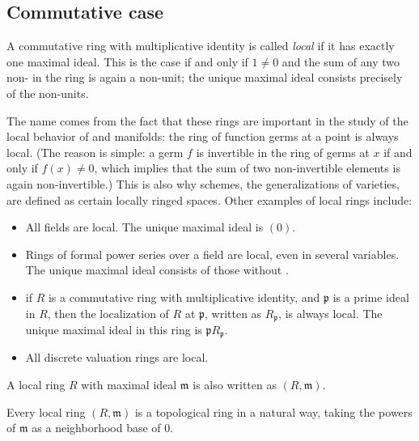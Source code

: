 \documentclass[12pt]{article}
\begin{document}

\subsection*{Commutative case}

A commutative ring with multiplicative identity is called {\em local} if it has exactly one maximal ideal.
This is the case if and only if $1\not=0$ and the sum of any two non- in the ring is again a non-unit; the unique maximal ideal consists precisely of the non-units.

The name comes from the fact that these rings are important in the study of the local behavior of  and manifolds: the ring of function germs at a point is always local. (The reason is simple: a germ $f$ is invertible in the ring of germs at $x$ if and only if $f(x)\not=0$, which implies that the sum of two non-invertible elements is again non-invertible.)
This is also why schemes, the generalizations of varieties, are defined as certain locally ringed spaces. Other examples of local rings include:
\begin{itemize}
\item All fields are local. The unique maximal ideal is $(0)$.
\item Rings of formal power series over a field are local, even in several variables. The unique maximal ideal consists of those  without .
\item if $R$ is a commutative ring with multiplicative identity, and $\mathfrak{p}$ is a prime ideal in $R$, then the localization of $R$ at $\mathfrak{p}$, written as $R_{\mathfrak{p}}$, is always local. The unique maximal ideal in this ring is $\mathfrak{p}R_{\mathfrak{p}}$.
\item All discrete valuation rings are local.
\end{itemize}

A local ring $R$ with maximal ideal $\mathfrak{m}$ is also written as $(R,\mathfrak{m})$.

Every local ring $(R,\mathfrak{m})$ is a topological ring in a natural way, taking the powers of $\mathfrak{m}$ as a neighborhood base of 0. 
\end{document}
